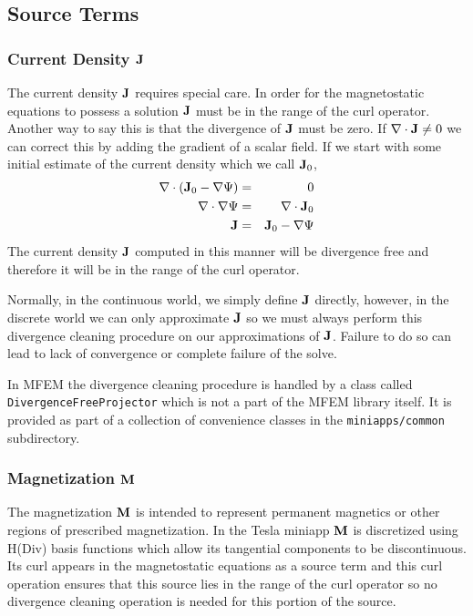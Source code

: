 \documentclass[12pt]{article}
\providecommand{\J}{\mbox{\bf J}}
\providecommand{\M}{\mbox{\bf M}}
\newcommand{\Div}{\nabla\cdot}
\newcommand{\Grad}{\nabla}
\begin{document}
\subsection{Source Terms}

\subsubsection{Current Density $\J$}

The current density $\J$ requires special care. In order for the
magnetostatic equations to possess a solution $\J$ must be in the
range of the curl operator. Another way to say this is that the
divergence of $\J$ must be zero.  If $\Div\J\neq 0$ we can correct
this by adding the gradient of a scalar field. If we start with some
initial estimate of the current density which we call $\J_0$,
\begin{eqnarray*}
  \Div\left(\J_0-\Grad\Psi\right) &=& 0 \\
  \Div\Grad\Psi &=& \Div\J_0 \\
  \J & = & \J_0 - \Grad\Psi
\end{eqnarray*}
The current density $\J$ computed in this manner will be divergence
free and therefore it will be in the range of the curl operator.

Normally, in the continuous world, we simply define $\J$ directly,
however, in the discrete world we can only approximate $\J$ so we must
always perform this divergence cleaning procedure on our approximations
of $\J$. Failure to do so can lead to lack of convergence or complete
failure of the solve.

In MFEM the divergence cleaning procedure is handled by a class called
{\tt DivergenceFreeProjector} which is not a part of the MFEM library
itself. It is provided as part of a collection of convenience classes
in the {\tt miniapps/common} subdirectory.

\subsubsection{Magnetization $\M$}

The magnetization $\M$ is intended to represent permanent magnetics or
other regions of prescribed magnetization. In the Tesla miniapp $\M$
is discretized using H(Div) basis functions which allow its tangential
components to be discontinuous. Its curl appears in the magnetostatic
equations as a source term and this curl operation ensures that this
source lies in the range of the curl operator so no divergence
cleaning operation is needed for this portion of the source.
\end{document}
